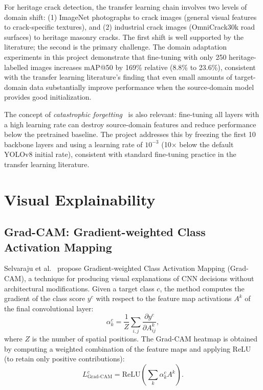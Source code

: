 \documentclass[12pt,a4paper]{article}
\begin{document}
For heritage crack detection, the transfer learning chain involves two levels of domain shift: (1) ImageNet photographs to crack images (general visual features to crack-specific textures), and (2) industrial crack images (OmniCrack30k road surfaces) to heritage masonry cracks. The first shift is well supported by the literature; the second is the primary challenge. The domain adaptation experiments in this project demonstrate that fine-tuning with only 250 heritage-labelled images increases mAP@50 by 169\% relative (8.8\% to 23.6\%), consistent with the transfer learning literature's finding that even small amounts of target-domain data substantially improve performance when the source-domain model provides good initialization.

The concept of \textit{catastrophic forgetting}~\cite{mccloskey1989catastrophic} is also relevant: fine-tuning all layers with a high learning rate can destroy source-domain features and reduce performance below the pretrained baseline. The project addresses this by freezing the first 10 backbone layers and using a learning rate of $10^{-3}$ (10$\times$ below the default YOLOv8 initial rate), consistent with standard fine-tuning practice in the transfer learning literature.

\section{Visual Explainability}
\label{sec:explain}

\subsection{Grad-CAM: Gradient-weighted Class Activation Mapping}

Selvaraju et al.~\cite{selvaraju2020gradcam} propose Gradient-weighted Class Activation Mapping (Grad-CAM), a technique for producing visual explanations of CNN decisions without architectural modifications. Given a target class $c$, the method computes the gradient of the class score $y^c$ with respect to the feature map activations $A^k$ of the final convolutional layer:
\begin{equation}
  \alpha_k^c = \frac{1}{Z} \sum_{i,j} \frac{\partial y^c}{\partial A^k_{ij}},
\end{equation}
where $Z$ is the number of spatial positions. The Grad-CAM heatmap is obtained by computing a weighted combination of the feature maps and applying ReLU (to retain only positive contributions):
\begin{equation}
  L_{\text{Grad-CAM}}^c = \text{ReLU}\!\left( \sum_k \alpha_k^c A^k \right).
\end{equation}
\end{document}
